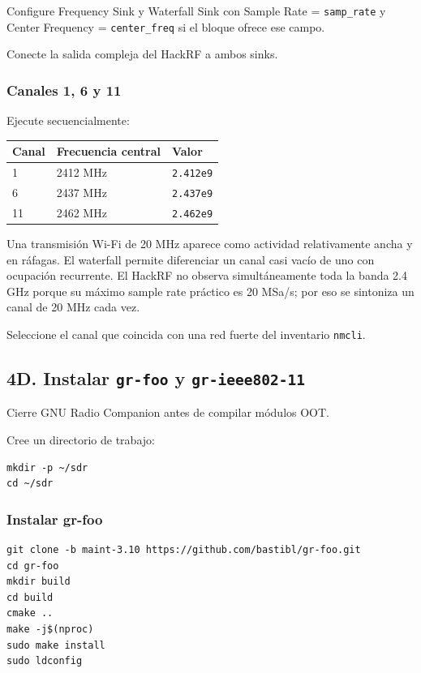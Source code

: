 Configure Frequency Sink y Waterfall Sink con Sample Rate = \texttt{samp\_rate} y Center Frequency = \texttt{center\_freq} si el bloque ofrece ese campo.

Conecte la salida compleja del HackRF a ambos sinks.

\subsubsection{Canales 1, 6 y 11}

Ejecute secuencialmente:

\begin{longtable}{@{}lll@{}}
\toprule
Canal & Frecuencia central & Valor \\
\midrule
1 & 2412 MHz & \texttt{2.412e9} \\
6 & 2437 MHz & \texttt{2.437e9} \\
11 & 2462 MHz & \texttt{2.462e9} \\
\bottomrule
\end{longtable}

\begin{esperado}
Una transmisión Wi-Fi de 20 MHz aparece como actividad relativamente ancha y en ráfagas. El waterfall permite diferenciar un canal casi vacío de uno con ocupación recurrente. El HackRF no observa simultáneamente toda la banda 2.4 GHz porque su máximo sample rate práctico es 20 MSa/s; por eso se sintoniza un canal de 20 MHz cada vez.
\end{esperado}

Seleccione el canal que coincida con una red fuerte del inventario \texttt{nmcli}.

\subsection{4D. Instalar \texttt{gr-foo} y \texttt{gr-ieee802-11}}

Cierre GNU Radio Companion antes de compilar módulos OOT.

Cree un directorio de trabajo:

\begin{lstlisting}
mkdir -p ~/sdr
cd ~/sdr
\end{lstlisting}

\subsubsection{Instalar gr-foo}

\begin{lstlisting}
git clone -b maint-3.10 https://github.com/bastibl/gr-foo.git
cd gr-foo
mkdir build
cd build
cmake ..
make -j$(nproc)
sudo make install
sudo ldconfig
\end{lstlisting}

